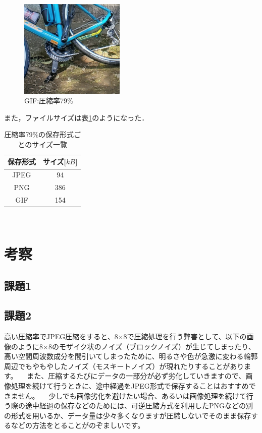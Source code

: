 \documentclass[a4paper,11pt]{bxjsarticle}
\begin{document}
     \begin{figure}[!htbp]
       \begin{center}
        \includegraphics[width=50mm]{sample_g79.eps}
       \end{center}
       \caption{GIF:圧縮率79\%}
       \label{fig:g79}
     \end{figure}

     また，ファイルサイズは表\ref{tab:result_filesize}のようになった．
     \begin{table}[htb]
      \begin{center}
        \caption{圧縮率79\%の保存形式ごとのサイズ一覧}
        \begin{tabular}{|c|c|} \hline
          保存形式 & サイズ[$kB$] \\\hline
          JPEG & 94  \\
          PNG & 386  \\ 
          GIF & 154  \\ \hline

        \end{tabular}
        \label{tab:result_filesize}
      \end{center}
    \end{table}
  


  　

\section{考察}
\subsection{課題1}

\subsection{課題2}
  高い圧縮率でJPEG圧縮をすると、8×8で圧縮処理を行う弊害として、以下の画像のように8×8のモザイク状のノイズ（ブロックノイズ）が生じてしまったり、高い空間周波数成分を間引いてしまったために、明るさや色が急激に変わる輪郭周辺でもやもやしたノイズ（モスキートノイズ）が現れたりすることがあります。
  　また、圧縮するたびにデータの一部分が必ず劣化していきますので、画像処理を続けて行うときに、途中経過をJPEG形式で保存することはおすすめできません。
  　少しでも画像劣化を避けたい場合、あるいは画像処理を続けて行う際の途中経過の保存などのためには、可逆圧縮方式を利用したPNGなどの別の形式を用いるか、データ量は少々多くなりますが圧縮しないでそのまま保存するなどの方法をとることがのぞましいです。
\end{document}
